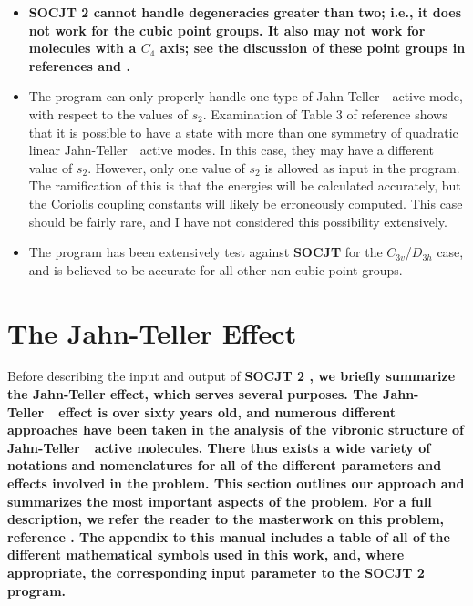 \documentclass{article}
\newcommand{\JT}{Jahn-Teller\ }
\newcommand{\socjttwo}{\bf{SOCJT 2 }}
\newcommand{\socjt}{{\bf SOCJT }}
\newenvironment{bulletlist}{%
  \renewcommand{\labelitemi}{$\bullet $}%
     \begin{itemize}}{\end{itemize}}
\begin{document}
\begin{bulletlist}
\item \socjttwo cannot handle degeneracies greater than two; i.e., it
  does not work for the cubic point groups. It also may not
  work for molecules with a $C_4$ axis; see the discussion of these
  point groups in references  and .
\item The program can only properly handle one type of \JT\ active
  mode, with respect to the values of $s_2$. Examination of
  Table 3 of reference  shows that it is possible to have
  a state with more than one symmetry of quadratic linear \JT\ active
  modes. In this case, they may have a different value of
  $s_2$. However, only one value of $s_2$ is allowed as input in the
  program. The ramification of this is that the energies will be
  calculated accurately, but the Coriolis coupling constants will
  likely be erroneously computed. This case should be fairly rare, and
  I have not considered this possibility extensively.
\item The program has been extensively test against \socjt for the $C_{3v}$/$D_{3h}$ case, and
  is believed to be accurate for all other non-cubic point groups.
\end{bulletlist}

\section{The Jahn-Teller Effect} \label{section:jt}

Before describing the input and output of \socjttwo, we briefly summarize
the Jahn-Teller effect, which serves several purposes. The \JT\ effect
is over sixty years old, and numerous different approaches have been
taken in the analysis of the vibronic structure of \JT\ active
molecules. There thus exists a wide variety of notations and
nomenclatures for all of the different parameters and effects involved
in the problem. This section outlines our approach and summarizes the
most important aspects of the problem. For a full description, we
refer the reader to the masterwork on this problem, reference
. The appendix to this manual includes a table of all of
the different mathematical symbols used in this work, and, where 
appropriate, the corresponding input parameter to the \socjttwo program.
\end{document}
